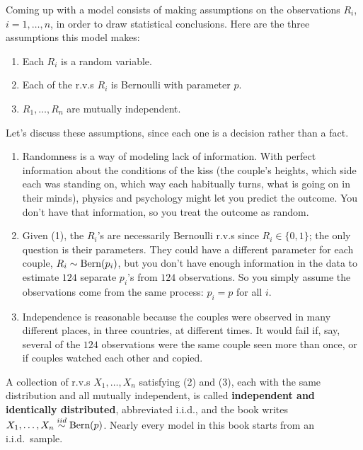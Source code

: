 Coming up with a model consists of making assumptions on the observations $R_i$, $i = 1, \ldots, n$, in order to draw statistical conclusions.
Here are the three assumptions this model makes:
\begin{enumerate}[nosep]
\item Each $R_i$ is a random variable.
\item Each of the r.v.s $R_i$ is Bernoulli with parameter $p$.
\item $R_1, \ldots, R_n$ are mutually independent.
\end{enumerate}

Let's discuss these assumptions, since each one is a decision rather than a fact.
\begin{enumerate}[nosep]
\item Randomness is a way of modeling lack of information.
With perfect information about the conditions of the kiss (the couple's heights, which side each was standing on, which way each habitually turns, what is going on in their minds), physics and psychology might let you predict the outcome.
You don't have that information, so you treat the outcome as random.
\item Given (1), the $R_i$'s are necessarily Bernoulli r.v.s since $R_i \in \{0, 1\}$; the only question is their parameters.
They could have a different parameter for each couple, $R_i \sim \text{Bern}(p_i)$, but you don't have enough information in the data to estimate $124$ separate $p_i$'s from $124$ observations.
So you simply assume the observations come from the same process: $p_i = p$ for all $i$.
\item Independence is reasonable because the couples were observed in many different places, in three countries, at different times.
It would fail if, say, several of the $124$ observations were the same couple seen more than once, or if couples watched each other and copied.
\end{enumerate}

A collection of r.v.s $X_1, \ldots, X_n$ satisfying (2) and (3), each with the same distribution and all mutually independent, is called \textbf{independent and identically distributed}, abbreviated i.i.d., and the book writes $X_1, \ldots, X_n \stackrel{iid}{\sim} \text{Bern}(p)$.
Nearly every model in this book starts from an i.i.d.\ sample.

